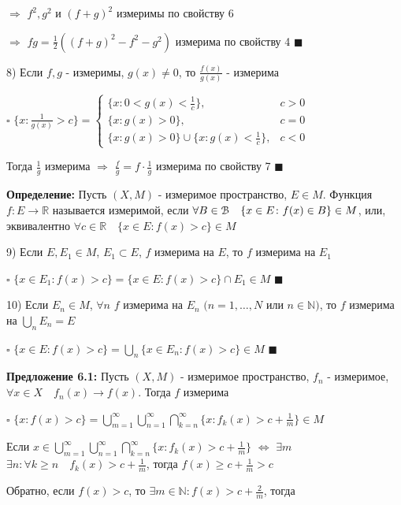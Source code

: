 \documentclass[a4paper]{report}
\begin{document}
$\Rightarrow$ $f^2,g^2$ и $(f+g)^2$ измеримы по свойству 6

$\Rightarrow$ $fg=\frac12\left((f+g)^2-f^2-g^2\right)$ измерима по свойству 4 $\blacksquare$
\bigskip
\bigskip

8) Если $f,g$ - измеримы, $g(x)\ne0$, то $\frac{f(x)}{g(x)}$ - измерима

\noindent $\square$ $\{x\colon\frac1{g(x)}>c\}=\begin{cases}\{x\colon0<g(x)<\frac1c\},&c>0\\ \{x\colon g(x)>0\},&c=0\\ \{x\colon g(x)>0\}\cup
\{x\colon g(x)<\frac1c\},&c<0\end{cases}$

Тогда $\frac1g$ измерима $\Rightarrow$ $\frac{f}{g}=f\cdot\frac1g$ измерима по свойству 7 $\blacksquare$
\bigskip

\noindent\textbf{Определение:} Пусть $(X,M)$ - измеримое пространство, $E\in M$. Функция $f\colon E\to\mathbb R$ называется измеримой, если $\forall B\in\EuScript B\quad\{x\in E\colon f(x)\in B\}\in M$, или, эквивалентно $\forall c\in\mathbb R\quad\{x\in E\colon f(x)>c\}\in M$
\bigskip

9) Если $E,E_1\in M$, $E_1\subset E$, $f$ измерима на $E$, то $f$ измерима на $E_1$

\noindent $\square$ $\{x\in E_1\colon f(x)>c\}=\{x\in E\colon f(x)>c\}\cap E_1\in M$ $\blacksquare$
\bigskip

10) Если $E_n\in M$, $\forall n$ $f$ измерима на $E_n$ $(n=1,\ldots,N$ или $n\in\mathbb N)$, то $f$ измерима на $\bigcup\limits_n E_n=E$

\noindent $\square$ $\{x\in E\colon f(x)>c\}=\bigcup\limits_n\{x\in E_n\colon f(x)>c\}\in M$ $\blacksquare$
\bigskip

\noindent\textbf{Предложение 6.1:} Пусть $(X,M)$ - измеримое пространство, $f_n$ - измеримое, $\forall x\in X\quad f_n(x)\to f(x)$. Тогда $f$ измерима

\noindent $\square$ $\{x\colon f(x)>c\}=\bigcup\limits_{m=1}^\infty\bigcup\limits_{n=1}^\infty\bigcap\limits_{k=n}^\infty\{x\colon f_k(x)> c+\frac1m\}\in M$

Если $x\in\bigcup\limits_{m=1}^\infty\bigcup\limits_{n=1}^\infty\bigcap\limits_{k=n}^\infty\{x\colon f_k(x)> c+\frac1m\}$ $\Leftrightarrow$ $\exists m$ $\exists n\colon\forall k\ge n\quad f_k(x)>c+\frac1m$, тогда $f(x)\ge c+\frac1m>c$

Обратно, если $f(x)>c$, то $\exists m\in\mathbb N\colon f(x)>c+\frac2m$, тогда
\end{document}
